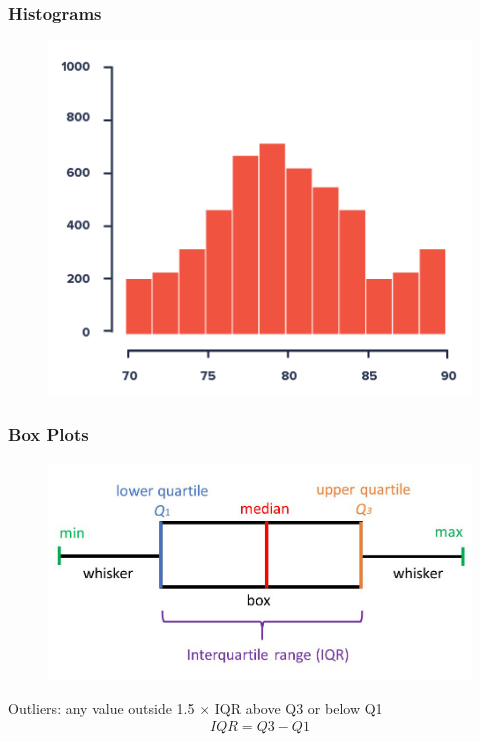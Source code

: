 \documentclass[12pt]{article}
\numberwithin{equation}{section}
\begin{document}
\subsubsection{Histograms}
\begin{figure}[!ht]
    \centering
    \includegraphics[width=0.6\linewidth]{figures/histogram.png}
\end{figure}

\subsubsection{Box Plots}
\begin{figure}[!ht]
    \centering
    \includegraphics[width=0.8\linewidth]{figures/boxplot.jpg}
\end{figure}
Outliers: any value outside 1.5 $\times$ IQR above Q3 or below Q1
\begin{align}
    IQR = Q3 - Q1
\end{align}
\end{document}
